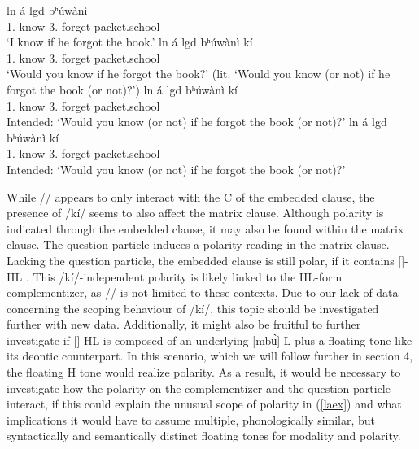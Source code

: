 \documentclass[output=paper,colorlinks,citecolor=brown]{langscibook}
\begin{document}
\ea \label{laex}
    \begin{xlist}
    \ex \label{laexa}
         {l\epL n} {\mbuHL} {{á}} {l\epL gd\schwaL\schwaH} {bʰ{ú}w{à}nì} {\ds\la} \\
             {1.} {know} {} {3.} {forget} {packet.school} {} \\
        \glt `I know if he forgot the book.'
    \ex \label{laexb}
         {l\epL n} {\mbuHL} {{á}} {l\epL gd\schwaL\schwaH} {bʰ{ú}w{à}nì} {k{í}} \\
             {1.} {know} {} {3.} {forget} {packet.school} {} \\
        \glt `Would you know if he forgot the book?' (lit. `Would you know (or not) if he forgot the book (or not)?')
    \ex \label{laexc}
         {l\epL n} {\mbuHL} {{á}} {l\epL gd\schwaL\schwaH} {bʰ{ú}w{à}nì} {\la} {k{í}} \\
             {1.} {know} {} {3.} {forget} {packet.school} {} {} \\
        \glt Intended: `Would you know (or not) if he forgot the book (or not)?'
    \ex \label{laexd}
         {l\epL n} {\mbuHL} {{á}} {l\epL gd\schwaL\schwaH} {bʰ{ú}w{à}nì} {k{í}} {\la} \\
             {1.} {know} {} {3.} {forget} {packet.school} {} {} \\
        \glt Intended: `Would you know (or not) if he forgot the book (or not)?'
    \end{xlist}
\z

While /\la/ appears to only interact with the C of the embedded clause, the presence of /k{í}/ seems to also affect the matrix clause. Although polarity is indicated through the embedded clause, it may also be found within the matrix clause. The question particle induces a polarity reading in the matrix clause. Lacking the question particle, the embedded clause is still polar, if it contains [\mbuHL]-HL . This /k{í}/-independent polarity is likely linked to the HL-form complementizer, as /\la/ is not limited to these contexts. Due to our lack of data concerning the scoping behaviour of /k{í}/, this topic should be investigated further with new data. Additionally, it might also be fruitful to further investigate if [\mbuHL]-HL is composed of an underlying [mbʉ̀]-L plus a floating tone like its deontic counterpart. In this scenario, which we will follow further in section 4, the floating H tone would realize polarity. As a result, it would be necessary to investigate how the polarity on the complementizer and the question particle interact, if this could explain the unusual scope of polarity in (\ref{laex}) and what implications it would have to assume multiple, phonologically similar, but syntactically and semantically distinct floating tones for modality and polarity.
\end{document}
